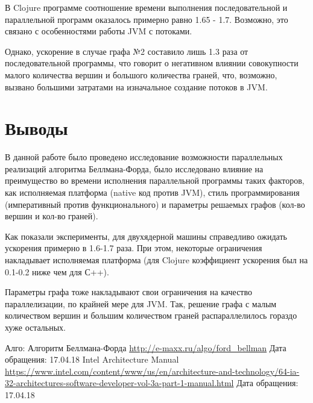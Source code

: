 \documentclass[utf8x, 14pt]{article}
\begin{document}
В Clojure программе соотношение времени выполнения последовательной и параллельной программ оказалось примерно равно 1.65 - 1.7. Возможно, это связано с особенностями работы JVM с потоками.

Однако, ускорение в случае графа №2 составило лишь 1.3 раза от последовательной программы, что говорит о негативном влиянии совокупности малого количества вершин и большого количества граней, что, возможно, вызвано большими затратами на изначальное создание потоков в JVM.

\section{Выводы}

В данной работе было проведено исследование возможности параллельных реализаций алгоритма Беллмана-Форда, было исследовано влияние на преимущество во времени исполнения параллельной программы таких факторов, как исполняемая платформа (native код против JVM), стиль программирования (императивный против функционального) и параметры решаемых графов (кол-во вершин и кол-во граней).

Как показали эксперименты, для двухядерной машины справедливо ожидать ускорения примерно в 1.6-1.7 раза. При этом, некоторые ограничения накладывает исполняемая платформа (для Clojure коэффициент ускорения был на 0.1-0.2 ниже чем для С++).

Параметры графа тоже накладывают свои ограничения на качество параллелизации, по крайней мере для JVM. Так, решение графа с малым количеством вершин и большим количеством граней распараллелилось гораздо хуже остальных.

\begin{thebibliography}{9}
 Алго: Алгоритм Беллмана-Форда \url{http://e-maxx.ru/algo/ford_bellman} Дата обращения: 17.04.18
 Intel Architecture Manual \url{https://www.intel.com/content/www/us/en/architecture-and-technology/64-ia-32-architectures-software-developer-vol-3a-part-1-manual.html} Дата обращения: 17.04.18
\end{thebibliography}
\end{document}
